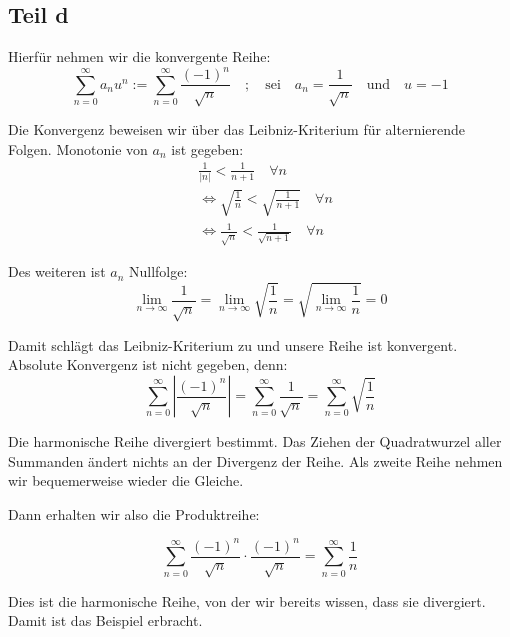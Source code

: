 \documentclass[a4paper,german,12pt,smallheadings]{scrartcl}
\begin{document}
\subsection*{Teil d}

Hierfür nehmen wir die konvergente Reihe:
\begin{equation*}
\sum\limits_{n=0}^{\infty} a_nu^n:=\sum\limits_{n=0}^{\infty} \frac{(-1)^n}{\sqrt{n}} \quad ; \quad \text{sei} \quad a_n=\frac{1}{\sqrt{n}} \quad \text{und} \quad u=-1
\end{equation*}

Die Konvergenz beweisen wir über das Leibniz-Kriterium für alternierende Folgen. Monotonie von $a_n$ ist gegeben:
\begin{align*}
  & \frac{1}{|n|}<\frac{1}{n+1} \quad \forall n\\
  & \Leftrightarrow \sqrt{\frac{1}{n}}<\sqrt{\frac{1}{n+1}} \quad \forall n\\
  & \Leftrightarrow \frac{1}{\sqrt{n}}< \frac{1}{\sqrt{n+1}} \quad \forall n
\end{align*}

Des weiteren ist $a_n$ Nullfolge:
\begin{equation}
\lim\limits_{n \to \infty} \frac{1}{\sqrt{n}}=\lim\limits_{n \to \infty} \sqrt{\frac{1}{n}}=\sqrt{\lim\limits_{n \to \infty} \frac{1}{n}}=0
\end{equation}

Damit schlägt das Leibniz-Kriterium zu und unsere Reihe ist konvergent. Absolute Konvergenz ist nicht gegeben, denn:
\begin{equation*}
\sum\limits_{n=0}^{\infty} |\frac{(-1)^n}{\sqrt{n}}| = \sum\limits_{n=0}^{\infty} \frac{1}{\sqrt{n}}=\sum\limits_{n=0}^{\infty} \sqrt{\frac{1}{n}}
\end{equation*}

Die harmonische Reihe divergiert bestimmt. Das Ziehen der Quadratwurzel aller
Summanden ändert nichts an der Divergenz der Reihe.  Als zweite Reihe nehmen
wir bequemerweise wieder die Gleiche.

Dann erhalten wir also die Produktreihe:

\begin{equation*}
  \sum\limits_{n=0}^{\infty} \frac{(-1)^n}{\sqrt{n}} \cdot \frac{(-1)^n}{\sqrt{n}}=\sum\limits_{n=0}^{\infty} \frac{1}{n}
\end{equation*}

Dies ist die harmonische Reihe, von der wir bereits wissen, dass sie divergiert. Damit ist das Beispiel erbracht.
\end{document}
